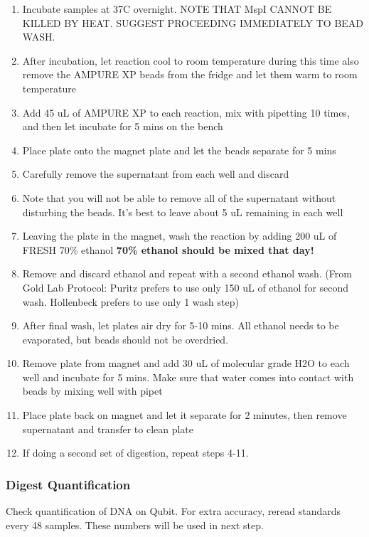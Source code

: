 \documentclass[11pt, oneside]{article}
\begin{document}
			\begin{enumerate}
			\item Incubate samples at 37C overnight. NOTE THAT MspI CANNOT BE KILLED BY HEAT.  SUGGEST PROCEEDING IMMEDIATELY TO BEAD WASH.
			\item After incubation, let reaction cool to room temperature during this time also remove the AMPURE XP beads from the fridge and let them warm to room temperature
			\item Add 45 uL of AMPURE XP to each reaction, mix with pipetting 10 times, and then let incubate for 5 mins on the bench
			\item Place plate onto the magnet plate and let the beads separate for 5 mins
			\item Carefully remove the supernatant from each well and discard
			\item Note that you will not be able to remove all of the supernatant without disturbing the beads. It's best to leave about 5 uL remaining in each well
			\item Leaving the plate in the magnet, wash the reaction by adding 200 uL of FRESH 70\% ethanol { \bf 70\% ethanol should be mixed that day!}
			\item Remove and discard ethanol and repeat with a second ethanol wash. (From Gold Lab Protocol: Puritz prefers to use only 150 uL of ethanol for second wash. Hollenbeck prefers to use only 1 wash step)
			\item After final wash, let plates air dry for 5-10 mins. All ethanol needs to be evaporated, but beads should not be overdried.
			\item Remove plate from magnet and add 30 uL of molecular grade H2O to each well and incubate for 5 mins. Make sure that water comes into contact with beads by mixing well with pipet
			\item Place plate back on magnet and let it separate for 2 minutes, then remove supernatant and transfer to clean plate
			\item If doing a second set of digestion, repeat steps 4-11.

			\end{enumerate}
			
		
\subsubsection {Digest Quantification}
		Check quantification of DNA on Qubit. For extra accuracy, reread standards every 48 samples. These numbers will be used in next step.
		
\end{document}
